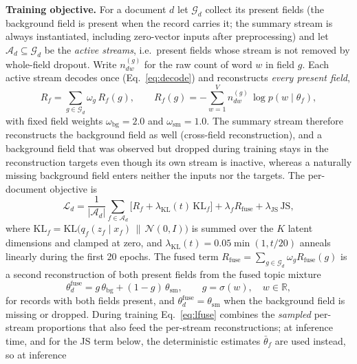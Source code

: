 \documentclass[Journal,letterpaper,NoLists]{ascelike-new}
\begin{document}
\noindent\textbf{Training objective.} For a document $d$ let $\mathcal{G}_d$ collect its present fields (the background field is present
when the record carries it; the summary stream is always instantiated, including zero-vector
inputs after preprocessing) and let
$\mathcal{A}_d\subseteq\mathcal{G}_d$ be the \emph{active streams}, i.e.\ present fields whose
stream is not removed by whole-field dropout. Write $n^{(g)}_{dw}$ for the raw count of word $w$
in field $g$. Each active stream decodes once (Eq.~\eqref{eq:decode}) and reconstructs
\emph{every present field},
\begin{equation}
R_f=\sum_{g\in\mathcal{G}_d}\omega_g\,R_f(g),\qquad
R_f(g)=-\sum_{w=1}^{V} n^{(g)}_{dw}\,\log p\!\left(w\mid\theta_f\right),
\label{eq:recon}
\end{equation}
with fixed field weights $\omega_{\mathrm{bg}}=2.0$ and $\omega_{\mathrm{sm}}=1.0$. The summary
stream therefore reconstructs the background field as well (cross-field reconstruction), and a
background field that was observed but dropped during training stays in the reconstruction
targets even though its own stream is inactive, whereas a naturally missing background field
enters neither the inputs nor the targets. The per-document objective is
\begin{equation}
\mathcal{L}_d=\frac{1}{|\mathcal{A}_d|}\sum_{f\in\mathcal{A}_d}
\Big[R_f+\lambda_{\mathrm{KL}}(t)\,\mathrm{KL}_f\Big]
+\lambda_f R_{\mathrm{fuse}}+\lambda_{\mathrm{JS}}\,\mathrm{JS},
\label{eq:total}
\end{equation}
where $\mathrm{KL}_f=\mathrm{KL}\big(q_f(z_f\mid x_f)\,\|\,\mathcal N(0,I)\big)$ is summed over
the $K$ latent dimensions and clamped at zero, and $\lambda_{\mathrm{KL}}(t)=0.05\min(1,t/20)$
anneals linearly during the first 20 epochs. The fused term
$R_{\mathrm{fuse}}=\sum_{g\in\mathcal{G}_d}\omega_g R_{\mathrm{fuse}}(g)$ is a second
reconstruction of both present fields from the fused topic mixture
\begin{equation}
\theta_d^{\mathrm{fuse}}=g\,\theta_{\mathrm{bg}}+(1-g)\,\theta_{\mathrm{sm}},
\qquad g=\sigma(w),\quad w\in\mathbb{R},
\label{eq:lfuse}
\end{equation}
for records with both fields present, and
$\theta_d^{\mathrm{fuse}}=\theta_{\mathrm{sm}}$ when the background field is missing or
dropped. During training Eq.~\eqref{eq:lfuse} combines the \emph{sampled} per-stream
proportions that also feed the per-stream reconstructions; at inference time, and for the JS
term below, the deterministic estimates $\bar\theta_f$ are used instead, so at inference
\end{document}
